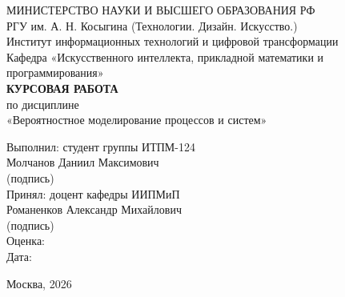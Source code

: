 \documentclass[a4paper]{article}
\theoremstyle{definition}
\begin{document}
\begin{titlepage}
    \begin{center}
        \large
        МИНИСТЕРСТВО НАУКИ И ВЫСШЕГО ОБРАЗОВАНИЯ РФ\\
        \vspace{0.3cm}
        РГУ им. А. Н. Косыгина (Технологии. Дизайн. Искусство.)\\
        \vspace{0.3cm}
        Институт информационных технологий и цифровой трансформации\\
        \vspace{0.3cm}
        Кафедра «Искусственного интеллекта, прикладной математики и программирования»\\
        \vspace{4cm}
        \huge \textbf{КУРСОВАЯ РАБОТА}\\
        \vspace{0.5cm}
        \Large по дисциплине\\
        \Large «Вероятностное моделирование процессов и систем»\\
        \vspace{3cm}
        \begin{flushright}
            \large
            Выполнил: студент группы ИТПМ-124\\
            Молчанов Даниил Максимович\\
            \vspace{0.2cm}
            \underline{\hspace{4cm}} (подпись)\\
            \vspace{0.5cm}
            Принял: доцент кафедры ИИПМиП\\
            Романенков Александр Михайлович\\
            \vspace{0.2cm}
            \underline{\hspace{4cm}} (подпись)\\
            \vspace{0.5cm}
            Оценка: \underline{\hspace{3cm}}\\
            Дата: \underline{\hspace{3cm}}\\
        \end{flushright}
        \vfill
        \large
        Москва, 2026
    \end{center}
\end{titlepage}
\end{document}
